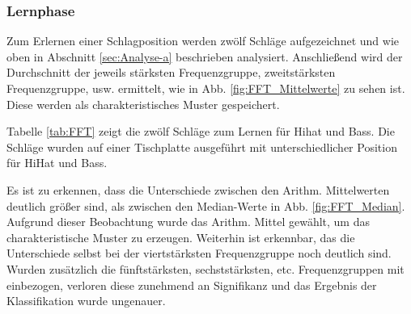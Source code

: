 \subsubsection{Lernphase}
\label{sec:Lernphase}
Zum Erlernen einer Schlagposition werden zwölf Schläge aufgezeichnet und wie oben in Abschnitt \ref{sec:Analyse-a} beschrieben analysiert.
Anschließend wird der Durchschnitt der jeweils stärksten Frequenzgruppe, zweitstärksten Frequenzgruppe, usw. ermittelt, wie in Abb. \ref{fig:FFT_Mittelwerte} zu sehen ist. 
Diese werden als charakteristisches Muster gespeichert.

Tabelle \ref{tab:FFT} zeigt die zwölf Schläge zum Lernen für Hihat und Bass.
Die Schläge wurden auf einer Tischplatte ausgeführt mit unterschiedlicher Position für HiHat und Bass.

Es ist zu erkennen, dass die Unterschiede zwischen den Arithm. Mittelwerten deutlich größer sind, als zwischen den Median-Werte in Abb. \ref{fig:FFT_Median}. 
Aufgrund dieser Beobachtung wurde das Arithm. Mittel gewählt, um das charakteristische Muster zu erzeugen. 
Weiterhin ist erkennbar, das die Unterschiede selbst bei der viertstärksten Frequenzgruppe noch deutlich sind.
Wurden zusätzlich die fünftstärksten, sechststärksten, etc. Frequenzgruppen mit einbezogen, verloren diese zunehmend an Signifikanz und das Ergebnis der Klassifikation wurde ungenauer.


